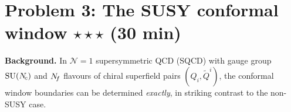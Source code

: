 \documentclass[11pt,a4paper]{article}
\begin{document}
\newpage

\section*{Problem 3: The SUSY conformal window
  \hfill $\star\star\star$ \normalsize(30 min)}
\label{prob:susy-window}

\noindent\textbf{Background.}
In $\mathcal{N}=1$ supersymmetric QCD (SQCD) with gauge group $\mathrm{SU}(N_{\!c})$
and $N_{\!f}$ flavours of chiral superfield pairs $(Q_i, \widetilde{Q}^i)$,
the conformal window boundaries can be determined \emph{exactly}, in
striking contrast to the non-SUSY case.
\end{document}
